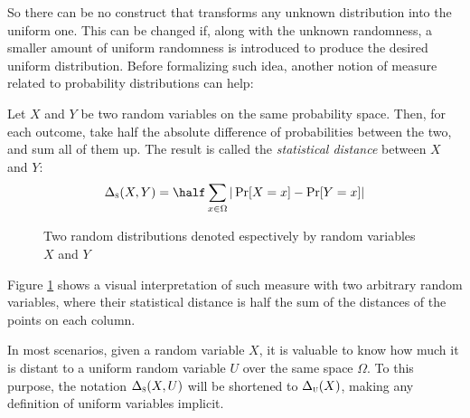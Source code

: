 So there can be no construct that transforms any unknown distribution into the uniform one. This can be changed if, along with the unknown randomness, a smaller amount of uniform randomness is introduced to produce the desired uniform distribution. Before formalizing such idea, another notion of measure related to probability distributions can help:

\begin{definition}
    Let $X$ and $Y$ be two random variables on the same probability space. Then, for each outcome, take half the absolute difference of probabilities between the two, and sum all of them up. The result is called the \emph{statistical distance} between $X$ and $Y$:
    \[
        \statdist(X, Y) = \half\sum_{x \in \Omega}|\Pr[X = x] - \Pr[Y = x]|
    \]
\end{definition}

\begin{figure}
    \centering
    \caption{Two random distributions denoted espectively by random variables $X$ and $Y$}
    \label{fig:statdist}
\end{figure}

Figure \ref{fig:statdist} shows a visual interpretation of such measure with two arbitrary random variables, where their statistical distance is half the sum of the distances of the points on each column.

In most scenarios, given a random variable $X$, it is valuable to know how much it is distant to a uniform random variable $U$ over the same space $\Omega$. To this purpose, the notation $\Delta_\textsc{s}(X, U)$ will be shortened to $\Delta_\textsc{u}(X)$, making any definition of uniform variables implicit.

